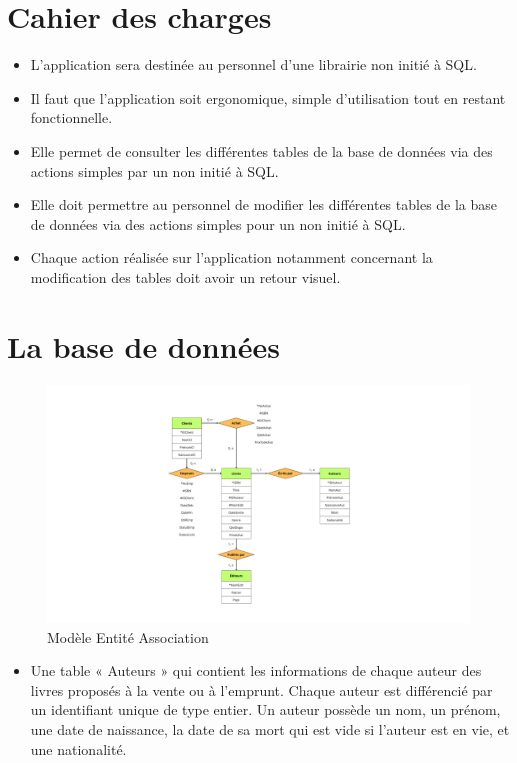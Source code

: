 \documentclass[10pt,a4paper]{scrartcl}
\begin{document}
\section{Cahier des charges}

\begin{itemize}
    \item L’application sera destinée au personnel d’une librairie non initié à SQL.
    \item Il faut que l'application soit ergonomique, simple d'utilisation tout en restant fonctionnelle.
    \item Elle permet de consulter les différentes tables de la base de données via des actions simples par un non initié à SQL.
    \item Elle doit permettre au personnel de modifier les différentes tables de la base de données via des actions simples pour un non initié à SQL.
    \item Chaque action réalisée sur l'application notamment concernant la modification des tables doit avoir un retour visuel.
\end{itemize}

\section{La base de données}

\begin{figure}
    \centering
    \includegraphics[trim=5cm 0cm 5cm 0cm, clip, width=1.2\textwidth]{MEA_BD}
    \caption{Modèle Entité Association}\label{fig.mea}
\end{figure}



\begin{itemize}
    \item Une table « Auteurs » qui contient les informations de chaque auteur des livres proposés à la vente ou à l’emprunt. Chaque auteur est différencié par un identifiant unique de 
    type entier. Un auteur possède un nom, un prénom, une date de naissance, la date de sa mort qui est vide si l’auteur est en vie, et une nationalité.
\end{itemize}
\end{document}
